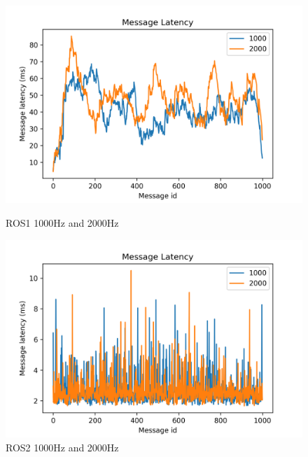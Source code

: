 \documentclass{mproj}
\begin{document}
\begin{figure}
\begin{minipage}[h]{0.5\linewidth}
\centering
\includegraphics[width = 1\textwidth]{high.png}
\caption{ROS1 1000Hz and 2000Hz}
\label{fig:side:a}
\end{minipage}%
\begin{minipage}[h]{0.5\linewidth}
\centering
\includegraphics[width = 1\textwidth]{high2.png}
\caption{ROS2 1000Hz and 2000Hz}
\label{fig:side:b}
\end{minipage}
\end{figure}
\end{document}
